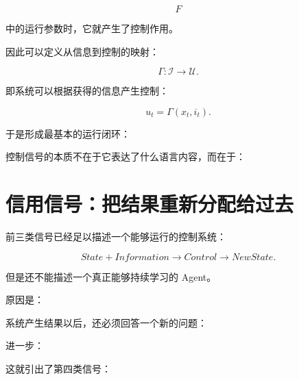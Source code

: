 \[
F
\]

中的运行参数时，它就产生了控制作用。

因此可以定义从信息到控制的映射：

\[
\boxed{
\Gamma:
\mathcal I
\rightarrow
\mathcal U.
}
\]

即系统可以根据获得的信息产生控制：

\[
u_t
=
\Gamma(
x_t,
i_t
).
\]

于是形成最基本的运行闭环：

\begin{statementbox}
\centering
{}
\end{statementbox}

控制信号的本质不在于它表达了什么语言内容，而在于：

\begin{statementbox}
\centering
{}
\end{statementbox}

\section{信用信号：把结果重新分配给过去}

前三类信号已经足以描述一个能够运行的控制系统：

\[
State
+
Information
\rightarrow
Control
\rightarrow
NewState.
\]

但是还不能描述一个真正能够持续学习的 Agent。

原因是：

系统产生结果以后，还必须回答一个新的问题：

\begin{statementbox}
\centering
{}
\end{statementbox}

进一步：

\begin{statementbox}
\centering
{}
\end{statementbox}

这就引出了第四类信号：

\begin{statementbox}
\centering
{}
\end{statementbox}

